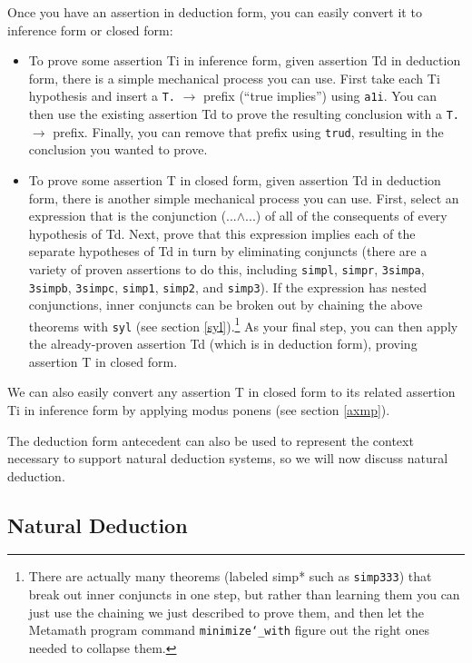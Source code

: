 Once you have an assertion in deduction form, you can easily convert it
to inference form or closed form:

\begin{itemize}
\item To
prove some assertion Ti in inference form, given assertion Td in deduction
form, there is a simple mechanical process you can use. First take each
Ti hypothesis and insert a \texttt{T.} $\rightarrow$ prefix (``true implies'')
using \texttt{a1i}. You
can then use the existing assertion Td to prove the resulting conclusion
with a \texttt{T.} $\rightarrow$ prefix.
Finally, you can remove that prefix using \texttt{trud},
resulting in the conclusion you wanted to prove.
\item To
prove some assertion T in closed form, given assertion Td in deduction
form, there is another simple mechanical process you can use. First,
select an expression that is the conjunction (...$\land$...) of all of the
consequents of every hypothesis of Td. Next, prove that this expression
implies each of the separate hypotheses of Td in turn by eliminating
conjuncts (there are a variety of proven assertions to do this, including
\texttt{simpl},
\texttt{simpr},
\texttt{3simpa},
\texttt{3simpb},
\texttt{3simpc},
\texttt{simp1},
\texttt{simp2},
and
\texttt{simp3}).
If the
expression has nested conjunctions, inner conjuncts can be broken out by
chaining the above theorems with \texttt{syl}
(see section \ref{syl}).\footnote{
There are actually many theorems
(labeled simp* such as \texttt{simp333}) that break out inner conjuncts in one
step, but rather than learning them you can just use the chaining we
just described to prove them, and then let the Metamath program command
\texttt{minimize{\char`\_}with}
figure out the right ones needed to collapse them.}
As your final step, you can then apply the already-proven assertion Td
(which is in deduction form), proving assertion T in closed form.
\end{itemize}

We can also easily convert any assertion T in closed form to its related
assertion Ti in inference form by applying
modus ponens (see section \ref{axmp}).

The deduction form antecedent can also be used to represent the context
necessary to support natural deduction systems, so we will now
discuss natural deduction.

\subsection{Natural Deduction}\label{naturaldeduction}

